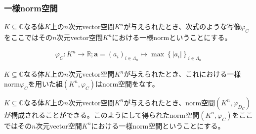 \documentclass[dvipdfmx]{jsarticle}
\begin{document}
\subsubsection{一様norm空間}
\begin{dfn}
$K \subseteq \mathbb{C}$なる体$K$上の$n$次元vector空間$K^{n}$が与えられたとき、次式のような写像$\varphi_{C}$をここではその$n$次元vector空間$K^{n}$における一様normということにする。
\end{dfn}
\begin{align*}
\varphi_{C}:K^{n} \rightarrow \mathbb{R};\mathbf{a} = \left( a_{i} \right)_{i \in \varLambda_{n}} \mapsto \max\left\{ \left| a_{i} \right| \right\}_{i \in \varLambda_{n}}
\end{align*}
\begin{thm}\label{2.3.2.4}
$K \subseteq \mathbb{C}$なる体$K$上の$n$次元vector空間$K^{n}$が与えられたとき、これにおける一様norm$\varphi_{C}$を用いた組$\left( K^{n},\varphi_{C} \right)$はnorm空間をなす。
\end{thm}
\begin{dfn}
$K \subseteq \mathbb{C}$なる体$K$上の$n$次元vector空間$K^{n}$が与えられたとき、norm空間$\left( K^{n},\varphi_{D_{C}} \right)$が構成されることができる。このようにして得られたnorm空間$\left( K^{n},\varphi_{C} \right)$をここではその$n$次元vector空間$K^{n}$における一様norm空間ということにする。
\end{dfn}
\end{document}
